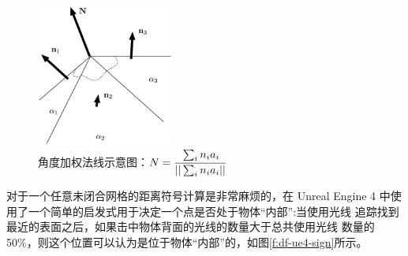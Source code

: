 \begin{figure}
	\sidecaption
	\includegraphics[width=0.4\textwidth]{figures/df/Computing-vertex-normals}
	\caption{角度加权法线示意图：$N=\cfrac{\sum_in_i a_i}{||\sum_in_ia_i||}$}
	\label{f:df-Computing-vertex-normals}
\end{figure}

对于一个任意未闭合网格的距离符号计算是非常麻烦的，在 Unreal Engine 4 中使用了一个简单的启发式用于决定一个点是否处于物体“内部”:当使用光线 追踪找到最近的表面之后，如果击中物体背面的光线的数量大于总共使用光线 数量的 50\%，则这个位置可以认为是位于物体“内部”的，如图\ref{f:df-ue4-sign}所示。

